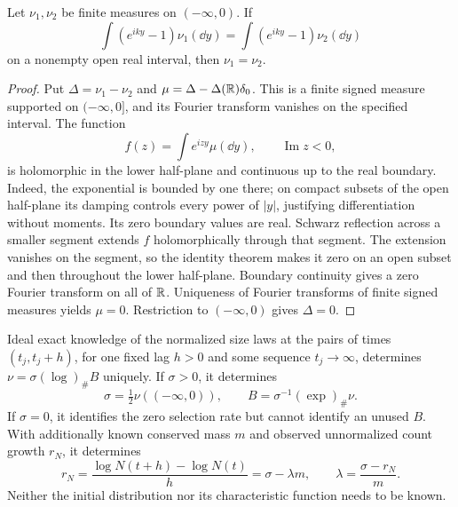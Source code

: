 \begin{lemma}\label{lem:one-sided}
Let $\nu_1,\nu_2$ be finite measures on $(-\infty,0)$. If
\[
 \int(e^{iky}-1)\nu_1(\dd y)
 =\int(e^{iky}-1)\nu_2(\dd y)
\]
on a nonempty open real interval, then $\nu_1=\nu_2$.
\end{lemma}

\begin{proof}
Put $\Delta=\nu_1-\nu_2$ and
$\mu=\Delta-\Delta(\mathbb R)\delta_0$. This is a finite signed measure
supported on $(-\infty,0]$, and its Fourier transform vanishes on the
specified interval. The function
\[
 f(z)=\int e^{izy}\mu(\dd y),\qquad \operatorname{Im}z<0,
\]
is holomorphic in the lower half-plane and continuous up to the real
boundary. Indeed, the exponential is bounded by one there; on compact
subsets of the open half-plane its damping controls every power of
$|y|$, justifying differentiation without moments.
Its zero boundary values are real. Schwarz reflection across a smaller
segment extends $f$ holomorphically through that segment. The extension
vanishes on the segment, so the identity theorem makes it zero on an
open subset and then throughout the lower half-plane. Boundary
continuity gives a zero Fourier transform on all of $\mathbb R$. Uniqueness
of Fourier transforms of finite signed measures yields $\mu=0$.
Restriction to $(-\infty,0)$ gives $\Delta=0$.
\end{proof}

\begin{theorem}\label{thm:fourier-identification}
Ideal exact knowledge of the normalized size laws at the pairs of times
$(t_j,t_j+h)$, for one fixed lag $h>0$ and some sequence $t_j\to\infty$,
determines $\nu=\sigma(\log)_\#B$ uniquely.
If $\sigma>0$, it determines
\begin{equation}
 \sigma=\tfrac12\nu((-\infty,0)),\qquad
 B=\sigma^{-1}(\exp)_\#\nu.
 \label{eq:daughter-recovery}
\end{equation}
If $\sigma=0$, it identifies the zero selection rate but cannot identify
an unused $B$. With additionally known conserved mass $m$ and observed
unnormalized count growth $r_N$, it determines
\begin{equation}
 r_N=\frac{\log N(t+h)-\log N(t)}h=\sigma-\lambda m,
 \qquad \lambda=\frac{\sigma-r_N}{m}.
 \label{eq:coag-recovery}
\end{equation}
Neither the initial distribution nor its characteristic function needs
to be known.
\end{theorem}


